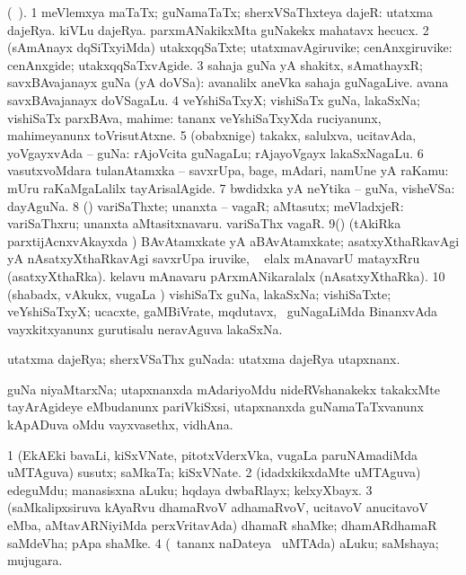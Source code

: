 \bentry
{}
\gl{\nA}
\bmng
(\bava\ ). 
\bnum
\num{1} meVlemxya maTaTx; guNamaTaTx; sherxVSaThxteya dajeR:   utatxma dajeRya.   kiVLu dajeRya.   parxmANakikxMta guNakekx mahatavx hecucx. 
\num{2} (sAmAnayx dqSiTxyiMda) utakxqqSaTxte; utatxmavAgiruvike; cenAnxgiruvike:  cenAnxgide; utakxqqSaTxvAgide. 
\num{3} sahaja guNa yA shakitx, sAmathayxR; savxBAvajanayx guNa (yA doVSa):  avanalilx aneVka sahaja guNagaLive.  avana savxBAvajanayx doVSagaLu. 
\num{4} veYshiSaTxyX; vishiSaTx guNa, lakaSxNa; vishiSaTx parxBAva, mahime:  tananx veYshiSaTxyXda ruciyanunx, mahimeyanunx toVrisutAtxne. 
\num{5} (obabxnige) takakx, salulxva, ucitavAda, yoVgayxvAda -- guNa:  rAjoVcita guNagaLu; rAjayoVgayx lakaSxNagaLu. 
\num{6} vasutxvoMdara tulanAtamxka -- savxrUpa, bage, mAdari, namUne yA raKamu:  mUru raKaMgaLalilx tayArisalAgide. 
\num{7} bwdidxka yA neYtika -- guNa, visheVSa:  dayAguNa. 
\num{8} (\pArxparx) variSaThxte; unanxta -- vagaR; aMtasutx; meVladxjeR:  variSaThxru; unanxta aMtasitxnavaru.  variSaThx vagaR. 
\num{9}(\takaR) (tAkiRka parxtijAcnxvAkayxda \vi) BAvAtamxkate yA aBAvAtamxkate; asatxyXthaRkavAgi yA nAsatxyXthaRkavAgi savxrUpa iruvike, \udA\  elalx mAnavarU matayxRru (asatxyXthaRka).  kelavu mAnavaru pArxmANikaralalx (nAsatxyXthaRka). 
\num{10} (shabadx, vAkukx, \mo vugaLa \vi) vishiSaTx guNa, lakaSxNa; vishiSaTxte; veYshiSaTxyX; ucacxte, gaMBiVrate, mqdutavx, \mo\ guNagaLiMda BinanxvAda vayxkitxyanunx gurutisalu neravAguva lakaSxNa. 
\enum
\emng
\eentry

\bentry
{}
\gl{\gu}
\bmng
utatxma dajeRya; sherxVSaThx guNada:   utatxma dajeRya utapxnanx. 
\emng
\eentry

\bentry
{}
\gl{\nA}
\bmng
guNa niyaMtarxNa; utapxnanxda mAdariyoMdu nideRVshanakekx takakxMte tayArAgideye eMbudanunx pariVkiSxsi, utapxnanxda guNamaTaTxvanunx kApADuva oMdu vayxvasethx, vidhAna. 
\emng
\eentry

\bentry
{}
\gl{\nA}
\bmng
\bnum
\num{1} (EkAEki bavaLi, kiSxVNate, pitotxVderxVka, \mo vugaLa paruNAmadiMda uMTAguva) susutx; saMkaTa; kiSxVNate. 
\num{2} (idadxkikxdaMte uMTAguva) edeguMdu; manasisxna aLuku; hqdaya dwbaRlayx; kelxyXbayx. 
\num{3} (saMkalipxsiruva kAyaRvu dhamaRvoV adhamaRvoV, ucitavoV anucitavoV eMba, aMtavARNiyiMda perxVritavAda) dhamaR shaMke; dhamARdhamaR saMdeVha; pApa shaMke. 
\num{4} (\kanmu\ tananx naDateya \vi\ uMTAda) aLuku; saMshaya; mujugara. 
\enum
\emng
\eentry

